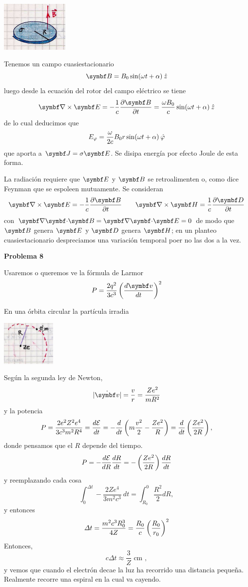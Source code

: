 \documentclass[10pt,oneside]{CBFT_book}
\begin{document}
\includegraphics[width=0.25\textwidth]{images/fig_ft1_frenadoJPG2.jpg}

Tenemos un campo cuasiestacionario
\[
	\vb B = B_0 \sin(\omega t + \a) \zver
\]
luego desde la ecuación del rotor del campo eléctrico se tiene
\[
	\rotorm{E} = -\frac{1}{c} \dpar{\vb B}{t} = \frac{\omega B_0}{c} \sin(\omega t + \a) \zver 
\]
de lo cual deducimos que 
\[
	E_\varphi = \frac{\omega}{2c} B_0r \sin(\omega t + \alpha) \:\hat{\varphi}
\]
que aporta a $\vb J =\sigma\vb E$.
Se disipa energía por efecto Joule de esta forma.

La radiación requiere que $\vb E$ y $\vb B$ se retroalimenten o, como dice Feynman que se espoleen
mutuamente. Se consideran
\[
	\rotorm{E} = -\frac{1}{c}\dpar{\vb B}{t} \qquad 
	\rotorm{H} = \frac{1}{c}\dpar{\vb D}{t}
\]
con $\divem{B} = \divem{E} = 0$ de modo que $\vb B$ genera $\vb E$ y $\vb D$ genera $\vb H$; en un 
planteo cuasiestacionario despreciamos una variación temporal poer no las dos a la vez.

\begin{ejemplo}{\bf Problema 8}

Usaremos o queremos ve la fórmula de Larmor
\[
	P = \frac{2q^2}{3c^3} \Frac{d\vb v}{dt}^2
\]

En una órbita circular la partícula irradia

\includegraphics[width=0.2\textwidth]{images/fig_ft1_orbita_circular_particula.jpg}

Según la segunda ley de Newton,
\[
	|\dot{\vb v}| = \frac{v}{r} = \frac{Ze^2}{mR^2}
\]
y la potencia
\[
	P = \frac{2e^2Z^2e^4}{3c^3m^2R^4} = \frac{d^{\hspace{-0.05em}} {\mathcal{E}}}{d {t}^{\hspace{-0.05em}}} = 
	- \frac{d^{\hspace{-0.05em}} {}}{d {t}^{\hspace{-0.05em}}}\left( m \frac{v^2}{2} - \frac{Ze^2}{R} \right)=
	\frac{d^{\hspace{-0.05em}} {}}{d {t}^{\hspace{-0.05em}}}\left( \frac{ Ze^2 }{ 2R } \right),
\]
donde pensamos que el $R$ depende del tiempo.
\[
	P = - \frac{d^{\hspace{-0.05em}} {\mathcal{E}}}{d {R}^{\hspace{-0.05em}}} \frac{d^{\hspace{-0.05em}} {R}}{d {t}^{\hspace{-0.05em}}} = - \left( \frac{ Ze^2 }{ 2R } \right) \frac{d^{\hspace{-0.05em}} {R}}{d {t}^{\hspace{-0.05em}}} 
\]
y reemplazando cada cosa
\[
	\int_0^{\Delta t} -\frac{2Ze^4}{3m^2c^3} \: dt = \int_{R_0}^0 \frac{R^2}{2}dR,
\]
y entonces
\[
	\Delta t = \frac{m^2 c^3 R_0^3}{4Z} = \frac{R_0}{c} \left( \frac{ R_0 }{ r_0 } \right)^2
\]
Entonces,
\[
	c \Delta t \approx \frac{3}{Z} \text{ cm },
\]
y vemos que cuando el electrón decae la luz ha recorrido una distancia pequeña.
Realmente recorre una espiral en la cual va cayendo.
 
\end{ejemplo}
\end{document}
